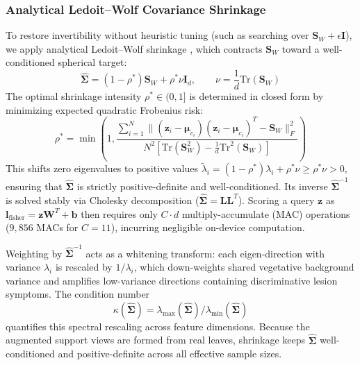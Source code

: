 \documentclass[preprint,12pt]{elsarticle}
\begin{document}
\subsubsection{Analytical Ledoit--Wolf Covariance Shrinkage}
\label{sec:shrinkage}
To restore invertibility without heuristic tuning (such as searching over $\mathbf{S}_W + \epsilon \mathbf{I}$), we apply analytical Ledoit--Wolf shrinkage \cite{ledoit2004well}, which contracts $\mathbf{S}_W$ toward a well-conditioned spherical target:
\begin{equation}
    \hat{\mathbf{\Sigma}} = (1 - \rho^*)\mathbf{S}_W + \rho^* \nu \mathbf{I}_d, \qquad \nu = \frac{1}{d}\text{Tr}(\mathbf{S}_W)
    \label{eq:lw_target}
\end{equation}
The optimal shrinkage intensity $\rho^* \in (0, 1]$ is determined in closed form by minimizing expected quadratic Frobenius risk:
\begin{equation}
    \rho^* = \min\left(1, \frac{\sum_{i=1}^N \|(\mathbf{z}_i - \boldsymbol{\mu}_{c_i})(\mathbf{z}_i - \boldsymbol{\mu}_{c_i})^T - \mathbf{S}_W\|_F^2}{N^2 \left[\text{Tr}(\mathbf{S}_W^2) - \frac{1}{d}\text{Tr}^2(\mathbf{S}_W)\right]}\right)
    \label{eq:lw_shrinkage}
\end{equation}
This shifts zero eigenvalues to positive values $\tilde{\lambda}_i = (1 - \rho^*)\lambda_i + \rho^* \nu \ge \rho^* \nu > 0$, ensuring that $\hat{\mathbf{\Sigma}}$ is strictly positive-definite and well-conditioned. Its inverse $\hat{\mathbf{\Sigma}}^{-1}$ is solved stably via Cholesky decomposition ($\hat{\mathbf{\Sigma}} = \mathbf{L}\mathbf{L}^T$). Scoring a query $\mathbf{z}$ as $\mathbf{l}_{\text{fisher}} = \mathbf{z}\mathbf{W}^T + \mathbf{b}$ then requires only $C \cdot d$ multiply-accumulate (MAC) operations ($9{,}856$ MACs for $C=11$), incurring negligible on-device computation.

Weighting by $\hat{\mathbf{\Sigma}}^{-1}$ acts as a whitening transform: each eigen-direction with variance $\lambda_i$ is rescaled by $1/\lambda_i$, which down-weights shared vegetative background variance and amplifies low-variance directions containing discriminative lesion symptoms. The condition number
\begin{equation}
    \kappa(\hat{\mathbf{\Sigma}}) = \lambda_{\max}(\hat{\mathbf{\Sigma}}) / \lambda_{\min}(\hat{\mathbf{\Sigma}})
    \label{eq:whitening_spread}
\end{equation}
quantifies this spectral rescaling across feature dimensions. Because the augmented support views are formed from real leaves, shrinkage keeps $\hat{\mathbf{\Sigma}}$ well-conditioned and positive-definite across all effective sample sizes.
\end{document}
